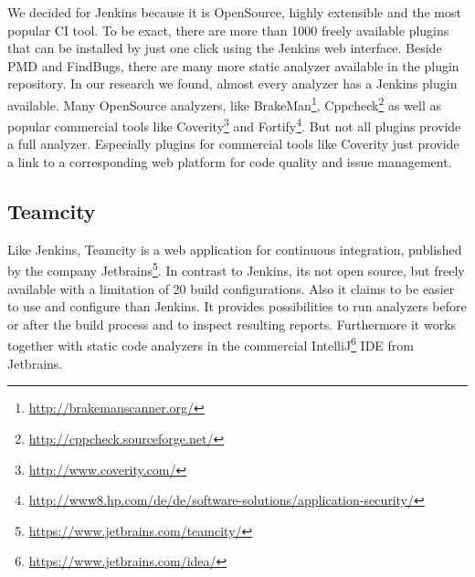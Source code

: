 \documentclass[conference]{IEEEtran}
\begin{document}
We decided for Jenkins because it is OpenSource, highly extensible and the most popular CI tool. To be exact, there are more than 1000 freely available plugins that can be installed by just one click using the Jenkins web interface.
Beside PMD and FindBugs, there are many more static analyzer available in the plugin repository.
In our research we found, almost every analyzer has a Jenkins plugin available.
Many OpenSource analyzers, like BrakeMan\footnote{\href{http://brakemanscanner.org/}{http://brakemanscanner.org/}}, Cppcheck\footnote{\href{http://cppcheck.sourceforge.net/}{http://cppcheck.sourceforge.net/}} as well as popular commercial tools like Coverity\footnote{\href{http://www.coverity.com/}{http://www.coverity.com/}} and Fortify\footnote{\href{http://www8.hp.com/de/de/software-solutions/application-security/}{http://www8.hp.com/de/de/software-solutions/application-security/}}.
But not all plugins provide a full analyzer.
Especially plugins for commercial tools like Coverity just provide a link to a corresponding web platform for code quality and issue management. 




\subsection{Teamcity}
\label{subsec:static_code_analysis_teamcity}
Like Jenkins, Teamcity is a web application for continuous integration, published by the company Jetbrains\footnote{\href{https://www.jetbrains.com/teamcity/}{https://www.jetbrains.com/teamcity/}}. In contrast to Jenkins, its not open source, but freely available with a limitation of 20 build configurations.
Also it claims to be easier to use and configure than Jenkins.
It provides possibilities to run analyzers before or after the build process and to inspect resulting reports.
Furthermore it works together with static code analyzers in the commercial IntelliJ\footnote{\href{https://www.jetbrains.com/idea/}{https://www.jetbrains.com/idea/}} IDE from Jetbrains.
\end{document}
